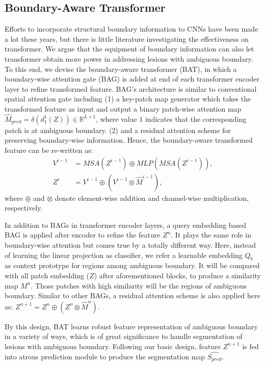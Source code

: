 \documentclass[runningheads]{paper478-llncs}
\begin{document}
\subsection{Boundary-Aware Transformer}
\label{section:boundary_prior}
Efforts to incorporate structural boundary information to CNNs have been made a lot these years, but there is little literature investigating the effectiveness on transformer.
We argue that the equipment of boundary information can also let transformer obtain more power in addressing lesions with ambiguous boundary. 
To this end, we devise the boundary-aware transformer (BAT), in which a boundary-wise attention gate (BAG) is added at end of each transformer encoder layer to refine transformed feature. BAG's architecture is similar to conventional spatial attention gate including (1) a key-patch map generator which takes the transformed feature as input and output a binary patch-wise attention map $\hat{M}_{pred} = \delta(d_1^1(Z))\in \mathbb{R}^{L \times 1}$, where value $1$ indicates that the corresponding patch is at ambiguous boundary. (2) and a residual attention scheme for preserving boundary-wise information. Hence, the boundary-aware transformed feature can be re-written as:
\begin{equation}
\begin{aligned}
    V^{i-1} &= MSA(Z^{i-1}) \oplus MLP(MSA(Z^{i-1})),\\
    Z^{i} &= V^{i-1} \oplus (V^{i-1} \otimes \hat{M}^{i-1}),
\end{aligned}
\end{equation}
where $\oplus$ and $\otimes$ denote element-wise addition and channel-wise multiplication, respectively. 

In addition to BAGs in transformer encoder layers, a query embedding based BAG is applied after encoder to refine the feature $Z^{n}$. It plays the same role in boundary-wise attention but comes true by a totally different way.
Here, instead of learning the linear projection as classifier, we refer a learnable embedding $Q_b$ as context prototype for regions among ambiguous boundary. It will be compared with all patch embedding ($Z$) after aforementioned blocks, to produce a similarity map $M^n$. Those patches with high similarity will be the regions of ambiguous boundary. Similar to other BAGs, a residual attention scheme is also applied here as: $Z^{n+1} = Z^{n} \oplus (Z^{n} \otimes \hat{M}^{n})$. 

By this design, BAT learns robust feature representation of ambiguous boundary in a variety of ways, which is of great significance to handle segmentation of lesions with ambiguous boundary. 
Following our basic design, feature $Z^{n+1}$ is fed into atrous prediction module to produce the segmentation map $\hat{S_{pred}}$.
\end{document}
